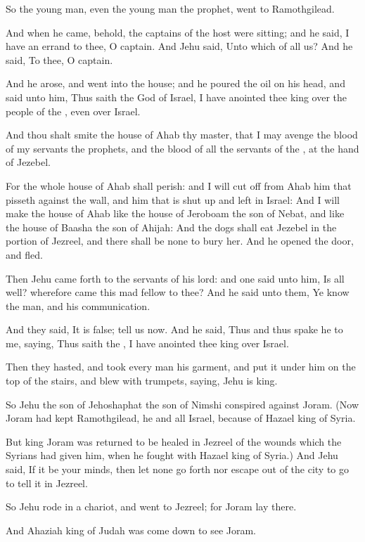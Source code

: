 \verse So the young man, even the young man the prophet, went to Ramothgilead.

\verse And when he came, behold, the captains of the host were sitting; and he said, I have an errand to thee, O captain. And Jehu said, Unto which of all us? And he said, To thee, O captain.

\verse And he arose, and went into the house; and he poured the oil on his head, and said unto him, Thus saith the \LORD God of Israel, I have anointed thee king over the people of the \LORD, even over Israel.

\verse And thou shalt smite the house of Ahab thy master, that I may avenge the blood of my servants the prophets, and the blood of all the servants of the \LORD, at the hand of Jezebel.

\verse For the whole house of Ahab shall perish: and I will cut off from Ahab him that pisseth against the wall, and him that is shut up and left in Israel: \verse And I will make the house of Ahab like the house of Jeroboam the son of Nebat, and like the house of Baasha the son of Ahijah: \verse And the dogs shall eat Jezebel in the portion of Jezreel, and there shall be none to bury her. And he opened the door, and fled.

\verse Then Jehu came forth to the servants of his lord: and one said unto him, Is all well? wherefore came this mad fellow to thee? And he said unto them, Ye know the man, and his communication.

\verse And they said, It is false; tell us now. And he said, Thus and thus spake he to me, saying, Thus saith the \LORD, I have anointed thee king over Israel.

\verse Then they hasted, and took every man his garment, and put it under him on the top of the stairs, and blew with trumpets, saying, Jehu is king.

\verse So Jehu the son of Jehoshaphat the son of Nimshi conspired against Joram. (Now Joram had kept Ramothgilead, he and all Israel, because of Hazael king of Syria.

\verse But king Joram was returned to be healed in Jezreel of the wounds which the Syrians had given him, when he fought with Hazael king of Syria.)  And Jehu said, If it be your minds, then let none go forth nor escape out of the city to go to tell it in Jezreel.

\verse So Jehu rode in a chariot, and went to Jezreel; for Joram lay there.

And Ahaziah king of Judah was come down to see Joram.

